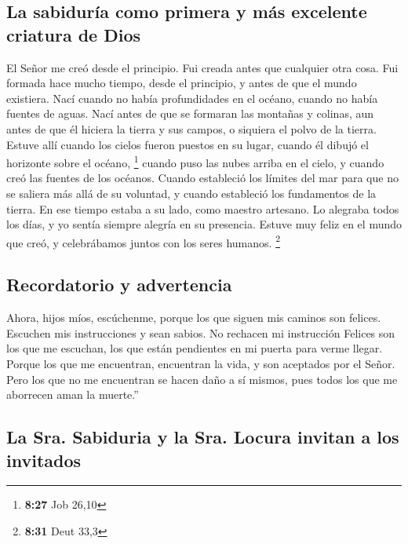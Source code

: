 \hypertarget{la-sabiduruxeda-como-primera-y-muxe1s-excelente-criatura-de-dios}{%
\subsection{La sabiduría como primera y más excelente criatura de
Dios}\label{la-sabiduruxeda-como-primera-y-muxe1s-excelente-criatura-de-dios}}

 El Señor me creó desde el principio. Fui creada antes que
cualquier otra cosa.  Fui formada hace mucho tiempo, desde
el principio, y antes de que el mundo existiera.  Nací
cuando no había profundidades en el océano, cuando no había fuentes de
aguas.  Nací antes de que se formaran las montañas y
colinas,  aun antes de que él hiciera la tierra y sus
campos, o siquiera el polvo de la tierra.  Estuve allí
cuando los cielos fueron puestos en su lugar, cuando él dibujó el
horizonte sobre el océano, \footnote{\textbf{8:27} Job 26,10}
 cuando puso las nubes arriba en el cielo, y cuando creó
las fuentes de los océanos.  Cuando estableció los límites
del mar para que no se saliera más allá de su voluntad, y cuando
estableció los fundamentos de la tierra.  En ese tiempo
estaba a su lado, como maestro artesano. Lo alegraba todos los días, y
yo sentía siempre alegría en su presencia.  Estuve muy
feliz en el mundo que creó, y celebrábamos juntos con los seres humanos.
\footnote{\textbf{8:31} Deut 33,3}

\hypertarget{recordatorio-y-advertencia}{%
\subsection{Recordatorio y
advertencia}\label{recordatorio-y-advertencia}}

 Ahora, hijos míos, escúchenme, porque los que siguen mis
caminos son felices.  Escuchen mis instrucciones y sean
sabios. No rechacen mi instrucción  Felices son los que me
escuchan, los que están pendientes en mi puerta para verme llegar.
 Porque los que me encuentran, encuentran la vida, y son
aceptados por el Señor.  Pero los que no me encuentran se
hacen daño a sí mismos, pues todos los que me aborrecen aman la
muerte.''

\hypertarget{la-sra.-sabiduria-y-la-sra.-locura-invitan-a-los-invitados}{%
\subsection{La Sra. Sabiduria y la Sra. Locura invitan a los
invitados}\label{la-sra.-sabiduria-y-la-sra.-locura-invitan-a-los-invitados}}

